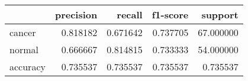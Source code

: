 \begin{tabular}{lrrrr}
\toprule
 & precision & recall & f1-score & support \\
\midrule
cancer & 0.818182 & 0.671642 & 0.737705 & 67.000000 \\
normal & 0.666667 & 0.814815 & 0.733333 & 54.000000 \\
accuracy & 0.735537 & 0.735537 & 0.735537 & 0.735537 \\
\bottomrule
\end{tabular}
